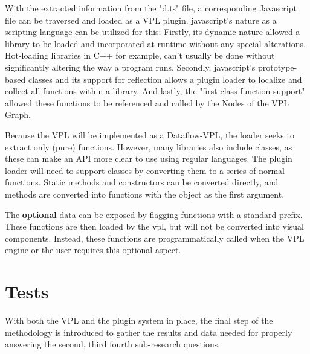 With the extracted information from the "d.ts" file, a corresponding Javascript file can be traversed and loaded as a VPL plugin. 
javascript's nature as a scripting language can be utilized for this:
Firstly, its dynamic nature allowed a library to be loaded and incorporated at runtime without any special alterations. 
Hot-loading libraries in C++ for example, can't usually be done without significantly altering the way a program runs. 
Secondly, javascript's prototype-based classes and its support for reflection allows a plugin loader to localize and collect all functions within a library.
And lastly, the "first-class function support" allowed these functions to be referenced and called by the Nodes of the VPL Graph. 

Because the VPL will be implemented as a Dataflow-VPL, the loader seeks to extract only (pure) functions. 
However, many libraries also include classes, as these can make an API more clear to use using regular languages. 
The plugin loader will need to support classes by converting them to a series of normal functions. 
Static methods and constructors can be converted directly, and methods are converted into functions with the object as the first argument.

The \textbf{optional} data can be exposed by flagging functions with a standard prefix.
These functions are then loaded by the vpl, but will not be converted into visual components. 
Instead, these functions are programmatically called when the VPL engine or the user requires this optional aspect. 


\newpage
\section{Tests}
\label{sec:method:tests}
With both the VPL and the plugin system in place, the final step of the methodology is introduced to gather the results and data needed for properly answering the second, third fourth sub-research questions.


